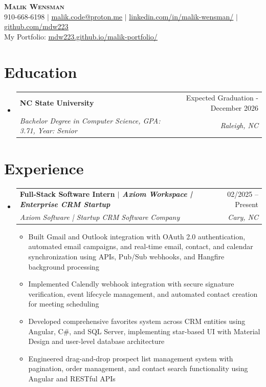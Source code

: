 \documentclass[letterpaper,11pt]{article}
\makeatletter
\newcommand{\resumeItem}[1]{
  \item\small{
    {#1 \vspace{-2pt}}
  }
}
\newcommand{\resumeSubheading}[4]{
  \vspace{-2pt}\item
    \begin{tabular*}{0.97\textwidth}[t]{l@{\extracolsep{\fill}}r}
      \textbf{#1} & #2 \\
      \textit{\small#3} & \textit{\small #4} \\
    \end{tabular*}\vspace{-7pt}
}
\newcommand{\resumeSubHeadingListStart}{\begin{itemize}[leftmargin=0.15in, label={}]}
\newcommand{\resumeSubHeadingListEnd}{\end{itemize}}
\newcommand{\resumeItemListStart}{\begin{itemize}}
\newcommand{\resumeItemListEnd}{\end{itemize}\vspace{-5pt}}
\makeatother
\begin{document}

\begin{center}
    \textbf{\Huge \scshape Malik Wensman} \\ \vspace{1pt}
    \small 910-668-6198 $|$ \href{mailto:malik.code@proton.me}{\underline{malik.code@proton.me}} $|$ 
    \href{https://www.linkedin.com/in/malik-wensman/}{\underline{linkedin.com/in/malik-wensman/}} $|$
    \href{https://github.com/mdw223}{\underline{github.com/mdw223}}
    \small \\ My Portfolio: 
    \href{https://mdw223.github.io/malik-portfolio/}{\underline{mdw223.github.io/malik-portfolio/}}
\end{center}


\section{Education}
  \resumeSubHeadingListStart
    \resumeSubheading
      {NC State University}{Expected Graduation - December 2026}
      {Bachelor Degree in Computer Science, GPA: 3.71, Year: Senior}{Raleigh, NC}
  \resumeSubHeadingListEnd

\section{Experience}
  \resumeSubHeadingListStart
    \resumeSubheading
      {\textbf{Full-Stack Software Intern} $|$ \emph{Axiom Workspace | Enterprise CRM Startup}}
      {02/2025 – Present}
      {Axiom Software | Startup CRM Software Company}{Cary, NC}
      \resumeItemListStart
        \resumeItem{Built Gmail and Outlook integration with OAuth 2.0 authentication, automated email campaigns, and real-time email, contact, and calendar synchronization using APIs, Pub/Sub webhooks, and Hangfire background processing}
        \resumeItem{Implemented Calendly webhook integration with secure signature verification, event lifecycle management, and automated contact creation for meeting scheduling}
        \resumeItem{Developed comprehensive favorites system across CRM entities using Angular, C\#, and SQL Server, implementing star-based UI with Material Design and user-level database architecture}
        \resumeItem{Engineered drag-and-drop prospect list management system with pagination, order management, and contact search functionality using Angular and RESTful APIs}
    \resumeItemListEnd
  \resumeSubHeadingListEnd
\end{document}
